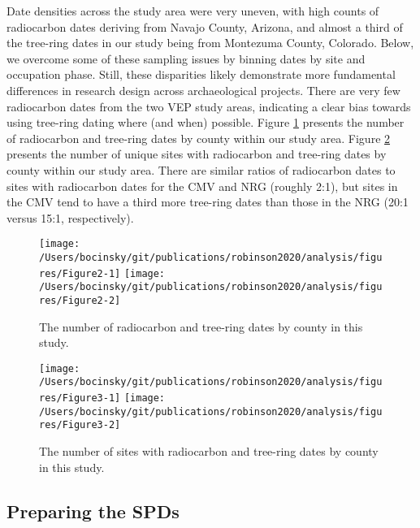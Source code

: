 \documentclass[
]{article}
\begin{document}
Date densities across the study area were very uneven, with high counts of radiocarbon dates deriving from Navajo County, Arizona, and almost a third of the tree-ring dates in our study being from Montezuma County, Colorado. Below, we overcome some of these sampling issues by binning dates by site and occupation phase. Still, these disparities likely demonstrate more fundamental differences in research design across archaeological projects. There are very few radiocarbon dates from the two VEP study areas, indicating a clear bias towards using tree-ring dating where (and when) possible. Figure \ref{fig:Figure2} presents the number of radiocarbon and tree-ring dates by county within our study area. Figure \ref{fig:Figure3} presents the number of unique sites with radiocarbon and tree-ring dates by county within our study area. There are similar ratios of radiocarbon dates to sites with radiocarbon dates for the CMV and NRG (roughly 2:1), but sites in the CMV tend to have a third more tree-ring dates than those in the NRG (20:1 versus 15:1, respectively).

\begin{figure}

{\centering \texttt{[image: /Users/bocinsky/git/publications/robinson2020/analysis/figures/Figure2-1]} \texttt{[image: /Users/bocinsky/git/publications/robinson2020/analysis/figures/Figure2-2]} 

}

\caption{The number of radiocarbon and tree-ring dates by county in this study.}\label{fig:Figure2}
\end{figure}

\begin{figure}

{\centering \texttt{[image: /Users/bocinsky/git/publications/robinson2020/analysis/figures/Figure3-1]} \texttt{[image: /Users/bocinsky/git/publications/robinson2020/analysis/figures/Figure3-2]} 

}

\caption{The number of sites with radiocarbon and tree-ring dates by county in this study.}\label{fig:Figure3}
\end{figure}

\hypertarget{preparing-the-spds}{%
\subsection*{Preparing the SPDs}\label{preparing-the-spds}}
\end{document}
